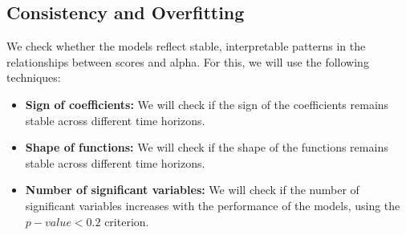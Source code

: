 \documentclass[11pt,english,a4paper,hidelinks]{book}
\begin{document}
\subsection{Consistency and Overfitting}
We check whether the models reflect stable, interpretable patterns in the relationships between scores and alpha. For this, we will use the following techniques:
\begin{itemize}
    \item \textbf{Sign of coefficients:} We will check if the sign of the coefficients remains stable across different time horizons.
    \item \textbf{Shape of functions:} We will check if the shape of the functions remains stable across different time horizons.
    \item \textbf{Number of significant variables:} We will check if the number of significant variables increases with the performance of the models, using the $p-value < 0.2$ criterion.
\end{itemize}
\end{document}
